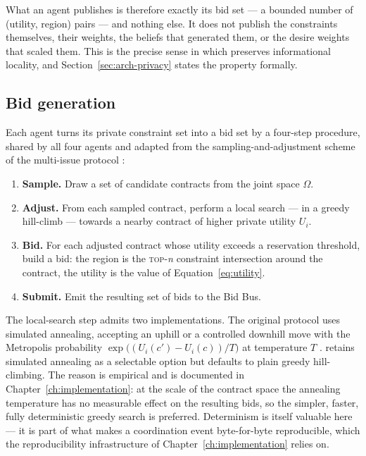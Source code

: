 What an agent publishes is therefore exactly its bid set --- a bounded
number of (utility, region) pairs --- and nothing else. It does not
publish the constraints themselves, their weights, the beliefs that
generated them, or the desire weights that scaled them. This is the
precise sense in which \NEXUS{} preserves informational locality, and
Section~\ref{sec:arch-privacy} states the property formally.

\subsection{Bid generation}
\label{subsec:bid-gen}

Each agent turns its private constraint set into a bid set by a
four-step procedure, shared by all four agents and adapted from the
sampling-and-adjustment scheme of the multi-issue protocol
\cite{ito2007multiissue,klein2003negotiating}:

\begin{enumerate}[leftmargin=1.8em,itemsep=0.2em]
  \item \textbf{Sample.} Draw a set of candidate contracts from the
    joint space $\Omega$.
  \item \textbf{Adjust.} From each sampled contract, perform a local
    search --- in \NEXUS{} a greedy hill-climb --- towards a nearby
    contract of higher private utility $U_i$.
  \item \textbf{Bid.} For each adjusted contract whose utility exceeds
    a reservation threshold, build a bid: the region is the
    \textsc{top}-\textit{n} constraint intersection around the contract, the
    utility is the value of Equation~\eqref{eq:utility}.
  \item \textbf{Submit.} Emit the resulting set of bids to the Bid Bus.
\end{enumerate}

The local-search step admits two implementations. The original protocol
uses simulated annealing, accepting an uphill or a controlled downhill
move with the Metropolis probability
$\exp\bigl((U_i(c') - U_i(c))/T\bigr)$ at temperature $T$
\cite{klein2003negotiating}. \NEXUS{} retains simulated annealing as a
selectable option but defaults to plain greedy hill-climbing. The reason
is empirical and is documented in
Chapter~\ref{ch:implementation}: at the scale of the \NEXUS{} contract
space the annealing temperature has no measurable effect on the
resulting bids, so the simpler, faster, fully deterministic greedy
search is preferred. Determinism is itself valuable here --- it is part
of what makes a coordination event byte-for-byte reproducible, which the
reproducibility infrastructure of Chapter~\ref{ch:implementation} relies
on.

